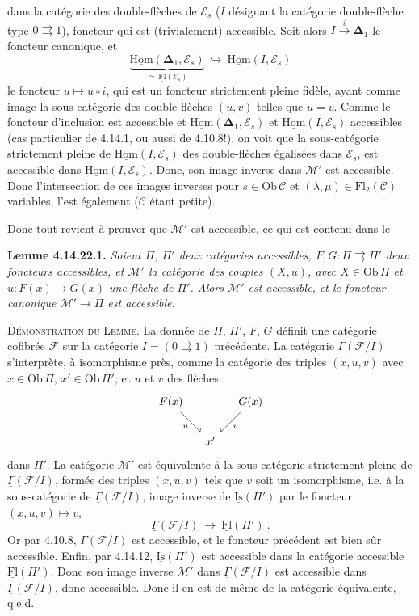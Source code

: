 \documentclass[11pt]{article}
\newcommand{\printedpage}[1]{\marginpar{\footnotesize p.~#1}}
\newcommand{\msp}[1]{\marginpar{\footnotesize [#1]}}
\newcommand{\uHom}{\underline{\mathrm{Hom}}}
\newcommand{\uFl}{\underline{\mathrm{Fl}}}
\newcommand{\uIs}{\underline{\mathrm{Is}}}
\newcommand{\uGamma}{\underline{\Gamma}}
\newcommand{\bDelta}{\boldsymbol{\Delta}}
\newcommand{\Ob}{\mathrm{Ob}\,}
\newcommand{\Fl}{\mathrm{Fl}}
\begin{document}
\printedpage{154}
dans la catégorie des double-flèches de $\mathcal{E}_s$ ($I$ désignant la catégorie double-flèche type $0\rightrightarrows 1$), foncteur qui est (trivialement) accessible. Soit alors $I\xrightarrow{\;i\;}\bDelta_1$ le foncteur canonique, et
\[
\underbrace{\uHom(\bDelta_1,\mathcal{E}_s)}_{\simeq\,\uFl(\mathcal{E}_s)}\ \hookrightarrow\ \uHom(I,\mathcal{E}_s)
\]
le foncteur $u\longmapsto u\circ i$, qui est un foncteur strictement pleine fidèle, ayant comme image la sous-catégorie des double-flèches $(u,v)$ telles que $u=v$. Comme le foncteur d'inclusion est accessible et $\uHom(\bDelta_1,\mathcal{E}_s)$ et $\uHom(I,\mathcal{E}_s)$ accessibles
\msp{page 406}
(cas particulier de 4.14.1, ou aussi de 4.10.8!), on voit que la sous-catégorie strictement pleine de $\uHom(I,\mathcal{E}_s)$ des double-flèches égalisées dans $\mathcal{E}_s$, est accessible dans $\uHom(I,\mathcal{E}_s)$. Donc, son image inverse dans $\mathcal{M}'$ est accessible. Donc l'intersection de ces images inverses pour $s\in\Ob\mathcal{C}$ et $(\lambda,\mu)\in\Fl_2(\mathcal{C})$ variables, l'est également ($\mathcal{C}$ étant petite).

Donc tout revient à prouver que $\mathcal{M}'$ est accessible, ce qui est contenu dans le

\textbf{Lemme 4.14.22.1.} \textit{Soient $\Pi$, $\Pi'$ deux catégories accessibles, $F,G:\Pi\rightrightarrows\Pi'$ deux foncteurs accessibles, et $\mathcal{M}'$ la catégorie des couples $(X,u)$, avec $X\in\Ob\Pi$ et $u:F(x)\longrightarrow G(x)$ une flèche de $\Pi'$. Alors $\mathcal{M}'$ est accessible, et le foncteur canonique $\mathcal{M}'\longrightarrow\Pi$ est accessible.} %

\textsc{Démonstration du Lemme.} La donnée de $\Pi$, $\Pi'$, $F$, $G$ définit une catégorie cofibrée $\mathcal{F}$ sur la catégorie $I=(0\rightrightarrows 1)$
\msp{page 407}
précédente. La catégorie $\uGamma(\mathcal{F}/I)$ s'interprète, à isomorphisme près, comme la catégorie des triples $(x,u,v)$ avec $x\in\Ob\Pi$, $x'\in\Ob\Pi'$, et $u$ et $v$ des flèches
\[
\begin{tikzcd}[column sep=small]
F(x) \arrow[dr, "u"'] & & G(x) \arrow[dl, "v"] \\
& x' &
\end{tikzcd}
\]
dans $\Pi'$. La catégorie $\mathcal{M}'$ est équivalente à la sous-catégorie strictement pleine de $\uGamma(\mathcal{F}/I)$, formée des triples $(x,u,v)$ tels que $v$ soit un isomorphisme, i.e. à la sous-catégorie de $\uGamma(\mathcal{F}/I)$, image inverse de $\uIs(\Pi')$ par le foncteur $(x,u,v)\longmapsto v$,
\[
\uGamma(\mathcal{F}/I)\ \longrightarrow\ \uFl(\Pi')\ .
\]
Or par 4.10.8, $\uGamma(\mathcal{F}/I)$ est accessible, et le foncteur précédent est bien sûr accessible. Enfin, par 4.14.12,
\msp{page 408}
$\uIs(\Pi')$ est accessible dans la catégorie accessible $\uFl(\Pi')$. Donc son image inverse $\mathcal{M}'$ dans $\uGamma(\mathcal{F}/I)$ est accessible dans $\uGamma(\mathcal{F}/I)$, donc accessible. Donc il en est de même de la catégorie équivalente, q.e.d.
\end{document}
